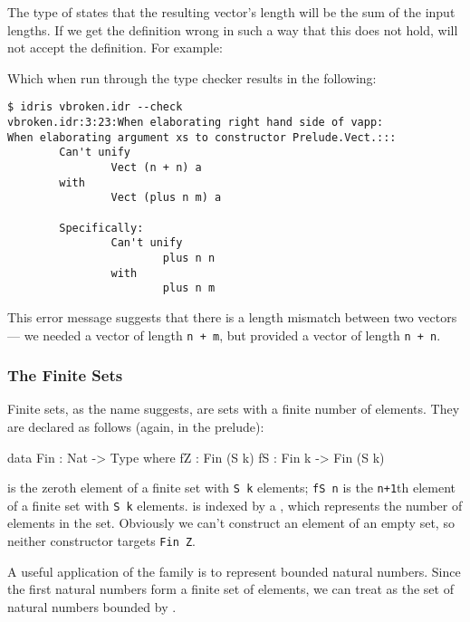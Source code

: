 \noindent
The type of \tFN{(++)} states that the resulting vector's length will be the sum of the input lengths.
If we get the definition wrong in such a way that this does not hold, \Idris{} will not accept the definition.
For example:


\noindent
Which when run through the \Idris{} type checker results in the following:

\begin{lstlisting}[style=stdout]
$ idris vbroken.idr --check
vbroken.idr:3:23:When elaborating right hand side of vapp:
When elaborating argument xs to constructor Prelude.Vect.:::
        Can't unify
                Vect (n + n) a
        with
                Vect (plus n m) a
        
        Specifically:
                Can't unify
                        plus n n
                with
                        plus n m
\end{lstlisting}

\noindent
This error message suggests that there is a length mismatch between two vectors
--- we needed a vector of length \texttt{n + m}, but provided a vector of length
\texttt{n + n}.


\subsubsection{The Finite Sets}

Finite sets, as the name suggests, are sets with a finite number of elements.
They are declared as follows (again, in the prelude):

\begin{code}
data Fin : Nat -> Type where
   fZ : Fin (S k)
   fS : Fin k -> Fin (S k)
\end{code}

\noindent
{} is the zeroth element of a finite set with \texttt{S k} elements; \texttt{fS n} is the \texttt{n+1}th element of a finite set with \texttt{S k} elements. 
 is indexed by a , which represents the number of elements in the set.
Obviously we can't construct an element of an empty set, so neither constructor targets \texttt{Fin Z}.

A useful application of the  family is to represent bounded natural numbers.
Since the first  natural numbers form a finite set of  elements, we can treat  as the set of natural numbers bounded by . 

